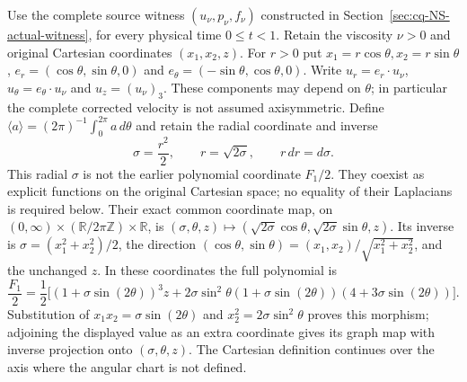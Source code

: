 Use the complete source witness $(u_\nu,p_\nu,f_\nu)$ constructed in
Section~\ref{sec:cq-NS-actual-witness}, for every physical time $0\leq t<1$. Retain
the viscosity $\nu>0$ and original Cartesian coordinates $(x_1,x_2,z)$.
For $r>0$ put $x_1=r\cos\theta,x_2=r\sin\theta$,
$e_r=(\cos\theta,\sin\theta,0)$ and
$e_\theta=(-\sin\theta,\cos\theta,0)$. Write
$u_r=e_r\cdot u_\nu$, $u_\theta=e_\theta\cdot u_\nu$ and
$u_z=(u_\nu)_3$. These components may depend on $\theta$; in particular
the complete corrected velocity is not assumed axisymmetric.
Define $\langle a\rangle=(2\pi)^{-1}\int_0^{2\pi}a\,d\theta$ and
retain the radial coordinate and inverse
\[
 \sigma=\frac{r^2}{2},\qquad r=\sqrt{2\sigma},\qquad
 r\,dr=d\sigma.
\]
This radial $\sigma$ is not the earlier polynomial coordinate $F_1/2$.
They coexist as explicit functions on the original Cartesian space;
no equality of their Laplacians is required below.
Their exact common coordinate map, on
$(0,\infty)\times(\mathbb R/2\pi\mathbb Z)\times\mathbb R$, is
$(\sigma,\theta,z)\mapsto
(\sqrt{2\sigma}\cos\theta,\sqrt{2\sigma}\sin\theta,z)$.
Its inverse is $\sigma=(x_1^2+x_2^2)/2$, the direction
$(\cos\theta,\sin\theta)=(x_1,x_2)/\sqrt{x_1^2+x_2^2}$,
and the unchanged $z$. In these coordinates the full polynomial is
\[
 \frac{F_1}{2}=\frac12\bigl[
 (1+\sigma\sin(2\theta))^3z
 +2\sigma\sin^2\theta(1+\sigma\sin(2\theta))
                         (4+3\sigma\sin(2\theta))\bigr].
\]
Substitution of $x_1x_2=\sigma\sin(2\theta)$ and
$x_2^2=2\sigma\sin^2\theta$ proves this morphism; adjoining the
displayed value as an extra coordinate gives its graph map with
inverse projection onto $(\sigma,\theta,z)$. The Cartesian definition
continues over the axis where the angular chart is not defined.

